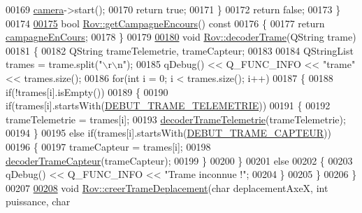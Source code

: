 \begin{DoxyCode}
00169         \hyperlink{class_rov_ad0461ecece812497ee9b4a962f168c18}{camera}->start();
00170         \textcolor{keywordflow}{return} \textcolor{keyword}{true};
00171     \}
00172     \textcolor{keywordflow}{return} \textcolor{keyword}{false};
00173 \}
00174 
\hyperlink{class_rov_a59d1a6d2ca83324e6efc0b74f2cff686}{00175} \textcolor{keywordtype}{bool} \hyperlink{class_rov_a59d1a6d2ca83324e6efc0b74f2cff686}{Rov::getCampagneEncours}()\textcolor{keyword}{ const}
00176 \textcolor{keyword}{}\{
00177     \textcolor{keywordflow}{return} \hyperlink{class_rov_abc9d61d10d8fb5e99283d3775baf98a8}{campagneEnCours};
00178 \}
00179 
\hyperlink{class_rov_ad818ff6ee1210ae44a24106b2bbbee7d}{00180} \textcolor{keywordtype}{void} \hyperlink{class_rov_ad818ff6ee1210ae44a24106b2bbbee7d}{Rov::decoderTrame}(QString trame)
00181 \{
00182     QString trameTelemetrie, trameCapteur;
00183 
00184     QStringList trames = trame.split(\textcolor{stringliteral}{"\(\backslash\)r\(\backslash\)n"});
00185     qDebug() << Q\_FUNC\_INFO << \textcolor{stringliteral}{"trame"} << trames.size();
00186     \textcolor{keywordflow}{for}(\textcolor{keywordtype}{int} i = 0; i < trames.size(); i++)
00187     \{
00188         \textcolor{keywordflow}{if}(!trames[i].isEmpty())
00189         \{
00190             \textcolor{keywordflow}{if}(trames[i].startsWith(\hyperlink{rov_8h_aa4d7955cdbd3d56086855ed938b980d1}{DEBUT\_TRAME\_TELEMETRIE}))
00191             \{
00192                 trameTelemetrie = trames[i];
00193                 \hyperlink{class_rov_a0d51099f9e1991ceffa0b6ed4a1c4e2e}{decoderTrameTelemetrie}(trameTelemetrie);
00194             \}
00195             \textcolor{keywordflow}{else} \textcolor{keywordflow}{if}(trames[i].startsWith(\hyperlink{rov_8h_a224f8acbc025db0e90045ce113761b0f}{DEBUT\_TRAME\_CAPTEUR}))
00196             \{
00197                 trameCapteur = trames[i];
00198                 \hyperlink{class_rov_ac1780c0484f427807f6207d17b564221}{decoderTrameCapteur}(trameCapteur);
00199             \}
00200         \}
00201         \textcolor{keywordflow}{else}
00202         \{
00203             qDebug() << Q\_FUNC\_INFO << \textcolor{stringliteral}{"Trame inconnue !"};
00204         \}
00205     \}
00206 \}
00207 
\hyperlink{class_rov_aa264d0723f6b491425ac2f85b933bab2}{00208} \textcolor{keywordtype}{void} \hyperlink{class_rov_aa264d0723f6b491425ac2f85b933bab2}{Rov::creerTrameDeplacement}(\textcolor{keywordtype}{char} deplacementAxeX, \textcolor{keywordtype}{int} puissance, \textcolor{keywordtype}{char} 

\end{DoxyCode}
